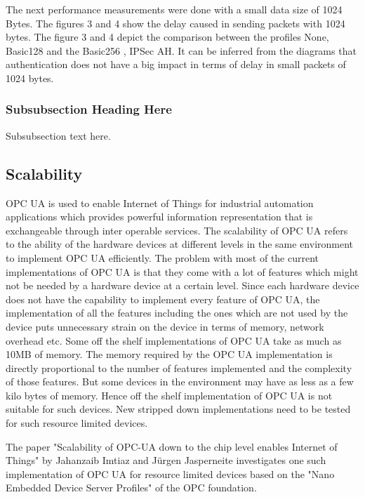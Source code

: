 \documentclass[conference]{IEEEtran}
\begin{document}
The next performance measurements were done with a small data size of 1024 Bytes. The figures 3 and 4 show the delay caused in sending packets with 1024 bytes. The figure 3 and 4 depict the comparison between the profiles None, Basic128 and the Basic256 , IPSec AH. It can be inferred from the diagrams that authentication does not have a big impact in terms of delay in small packets of 1024 bytes.	 	 


\subsubsection{Subsubsection Heading Here}
Subsubsection text here.

\subsection{Scalability}
OPC UA is used to enable Internet of Things for industrial automation applications which provides powerful information representation that is exchangeable through inter operable services. The scalability of OPC UA refers to the ability of the hardware devices at different levels in the same environment to implement OPC UA efficiently. The problem with most of the current implementations of OPC UA is that they come with a lot of features which might not be needed by a hardware device at a certain level. Since each hardware device does not have the capability to implement every feature of OPC UA, the implementation  of all the features including the ones which are not used by the device puts unnecessary strain on the device in terms of memory, network overhead etc. 
Some off the shelf implementations of OPC UA take as much as 10MB of memory. \cite{6622935} The memory required by the OPC UA implementation is directly proportional to the number of features implemented and the complexity of those features. But some devices in the environment may have as less as a few kilo bytes of memory. Hence off the shelf implementation of OPC UA is not suitable for such devices. New stripped down implementations need to be tested for such resource limited devices. 

The paper "Scalability of OPC-UA down to the chip level enables Internet of Things" by Jahanzaib Imtiaz and Jürgen Jasperneite investigates one such implementation of OPC UA for resource limited devices based on the "Nano Embedded Device Server Profiles" of the OPC foundation.   
\end{document}
